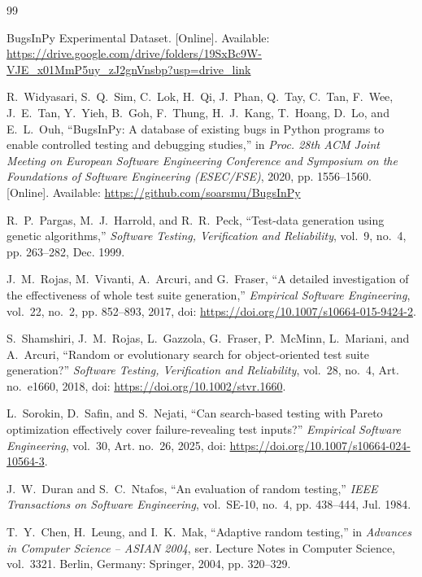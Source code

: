 \documentclass[12pt,onecolumn]{IEEEtran}
\begin{document}
\balance
\begin{thebibliography}{99}

BugsInPy Experimental Dataset.
[Online]. Available:
\url{https://drive.google.com/drive/folders/19SxBc9W-VJE_x01MmP5uy_zJ2gnVnsbp?usp=drive_link}

R.~Widyasari, S.~Q.~Sim, C.~Lok, H.~Qi, J.~Phan, Q.~Tay, C.~Tan,
F.~Wee, J.~E.~Tan, Y.~Yieh, B.~Goh, F.~Thung, H.~J.~Kang,
T.~Hoang, D.~Lo, and E.~L.~Ouh,
``BugsInPy: A database of existing bugs in Python programs to enable
controlled testing and debugging studies,''
in \emph{Proc. 28th ACM Joint Meeting on European Software Engineering
Conference and Symposium on the Foundations of Software Engineering
(ESEC/FSE)}, 2020, pp. 1556--1560.
[Online]. Available: \url{https://github.com/soarsmu/BugsInPy}

R.~P.~Pargas, M.~J.~Harrold, and R.~R.~Peck,
``Test-data generation using genetic algorithms,''
\emph{Software Testing, Verification and Reliability},
vol.~9, no.~4, pp. 263--282, Dec. 1999.

J.~M.~Rojas, M.~Vivanti, A.~Arcuri, and G.~Fraser,
``A detailed investigation of the effectiveness of whole test suite
generation,''
\emph{Empirical Software Engineering},
vol.~22, no.~2, pp. 852--893, 2017,
doi: \url{https://doi.org/10.1007/s10664-015-9424-2}.

S.~Shamshiri, J.~M.~Rojas, L.~Gazzola, G.~Fraser, P.~McMinn,
L.~Mariani, and A.~Arcuri,
``Random or evolutionary search for object-oriented test suite
generation?''
\emph{Software Testing, Verification and Reliability},
vol.~28, no.~4, Art. no.~e1660, 2018,
doi: \url{https://doi.org/10.1002/stvr.1660}.

L.~Sorokin, D.~Safin, and S.~Nejati,
``Can search-based testing with Pareto optimization effectively cover
failure-revealing test inputs?''
\emph{Empirical Software Engineering},
vol.~30, Art. no.~26, 2025,
doi: \url{https://doi.org/10.1007/s10664-024-10564-3}.

J.~W.~Duran and S.~C.~Ntafos,
``An evaluation of random testing,''
\emph{IEEE Transactions on Software Engineering},
vol.~SE-10, no.~4, pp. 438--444, Jul. 1984.

T.~Y.~Chen, H.~Leung, and I.~K.~Mak,
``Adaptive random testing,''
in \emph{Advances in Computer Science -- ASIAN 2004},
ser. Lecture Notes in Computer Science, vol.~3321.
Berlin, Germany: Springer, 2004, pp. 320--329.


\end{thebibliography}
\end{document}
